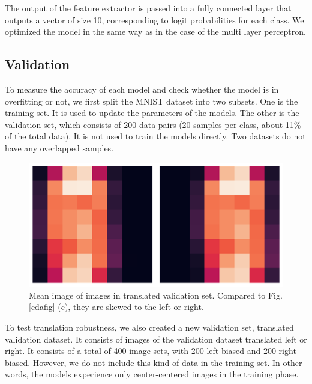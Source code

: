 \documentclass[main.tex]{subfiles}
\begin{document}
The output of the feature extractor is passed into a fully connected layer that outputs a vector of size 10, corresponding to logit probabilities for each class.
We optimized the model in the same way as in the case of the multi layer perceptron.

\subsection{Validation}
To measure the accuracy of each model and check whether the model is in overfitting or not, we first split the MNIST dataset into two subsets.
One is the training set. It is used to update the parameters of the models.
The other is the validation set, which consists of 200 data pairs (20 samples per class, about 11\% of the total data). It is not used to train the models directly.
Two datasets do not have any overlapped samples.

\begin{figure}[H]
	\centering
	\includegraphics[scale=0.5]{img/experiment/translated_img.png}
	
	\caption{Mean image of images in translated validation set. Compared to Fig. \ref*{edafig}-(c), they are skewed to the left or right.}
	\label{translation}
\end{figure}

To test translation robustness, we also created a new validation set, translated validation dataset.
It consists of images of the validation dataset translated left or right.
It consists of a total of 400 image sets, with 200 left-biased and 200 right-biased.
However, we do not include this kind of data in the training set.
In other words, the models experience only center-centered images in the training phase.
\end{document}
